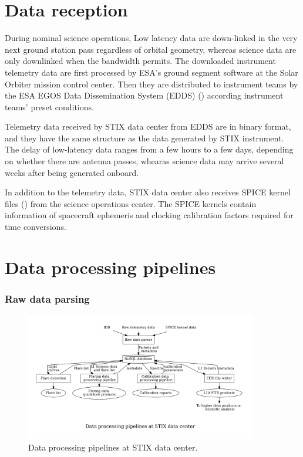 \documentclass{aa}
\begin{document}

\section{Data reception}

During nominal science operations,
Low latency data are down-linked in the very next ground station pass regardless of orbital geometry, 
whereas science data are only downlinked when the bandwidth permits.
The downloaded instrument telemetry data are first processed by ESA's ground segment
software at the Solar Orbiter mission control center. Then they
are distributed to instrument teams by the ESA EGOS Data
Dissemination System (EDDS) (\cite{EDDS}) according instrument teams' preset conditions.


Telemetry data received by STIX data center from EDDS  are in binary format, 
and  they have the same structure as the data generated by STIX instrument.
The delay of low-latency data ranges from a few hours to a few days, depending on whether there
are antenna passes, whearas science data may arrive several weeks after being generated onboard.


In addition to the telemetry data, STIX data center also receives SPICE kernel files (\cite{spice})  from the science operations center.
The SPICE kernels contain information of spacecraft ephemeris and clocking calibration factors required for time conversions.


\section{Data processing pipelines}
\subsubsection{Raw data parsing}

\begin{figure}
    \centering
    \includegraphics[width=0.9\textwidth]{figures/pipelines.pdf}
    \caption{Data processing pipelines at STIX data center.}
    \label{fig:main_pipelines}
\end{figure}
\end{document}
